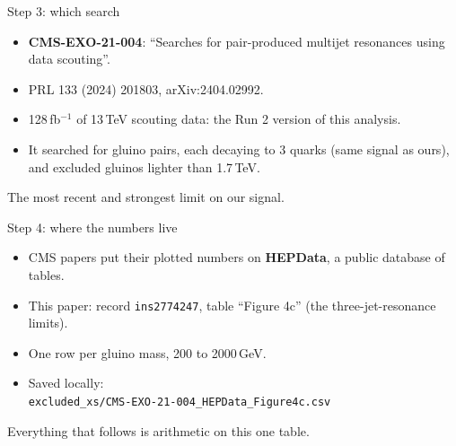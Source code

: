 \documentclass[aspectratio=169,12pt]{beamer}
\newcommand{\takeaway}[1]{\vfill
  \colorbox{boxbg}{\parbox{0.96\textwidth}{\centering\vspace{0.3em}#1\vspace{0.3em}}}
  \par\vspace{0.6em}}
\begin{document}

\begin{frame}{Step 3: which search}
  \begin{itemize}
    \item \textbf{CMS-EXO-21-004}: ``Searches for pair-produced multijet
          resonances using data scouting''.
    \item PRL 133 (2024) 201803, arXiv:2404.02992.
    \item 128\,fb$^{-1}$ of 13\,TeV scouting data: the Run 2 version of this
          analysis.
    \item It searched for gluino pairs, each decaying to 3 quarks (same signal
          as ours), and excluded gluinos lighter than 1.7\,TeV.
  \end{itemize}
  \takeaway{The most recent and strongest limit on our signal.}
\end{frame}

\begin{frame}{Step 4: where the numbers live}
  \begin{itemize}
    \item CMS papers put their plotted numbers on \textbf{HEPData}, a public
          database of tables.
    \item This paper: record \texttt{ins2774247}, table ``Figure 4c''
          (the three-jet-resonance limits).
    \item One row per gluino mass, 200 to 2000\,GeV.
    \item Saved locally:\\
          {\small\texttt{excluded\_xs/CMS-EXO-21-004\_HEPData\_Figure4c.csv}}
  \end{itemize}
  \takeaway{Everything that follows is arithmetic on this one table.}
\end{frame}

\end{document}
